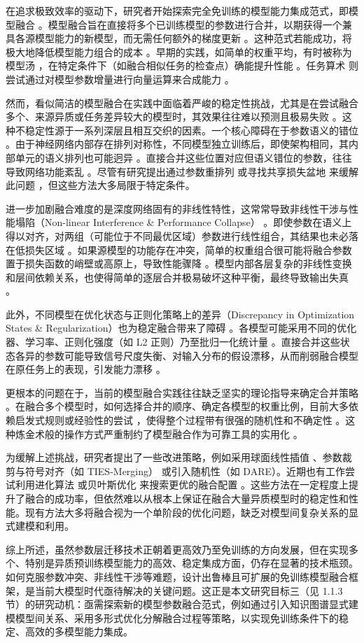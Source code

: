 \documentclass[../main.tex]{subfiles}
\begin{document}
在追求极致效率的驱动下，研究者开始探索完全免训练的模型能力集成范式，即模型融合 。模型融合旨在直接将多个已训练模型的参数进行合并，以期获得一个兼具各源模型能力的新模型，而无需任何额外的梯度更新 。这种范式若能成功，将极大地降低模型能力组合的成本 。早期的实践，如简单的权重平均，有时被称为模型汤 ，在特定条件下（如融合相似任务的检查点）确能提升性能 。任务算术 则尝试通过对模型参数增量进行向量运算来合成能力 。

然而，看似简洁的模型融合在实践中面临着严峻的稳定性挑战，尤其是在尝试融合多个、来源异质或任务差异较大的模型时，其效果往往难以预测且极易失败 。这种不稳定性源于一系列深层且相互交织的因素。一个核心障碍在于参数语义的错位 。由于神经网络内部存在排列对称性，不同模型独立训练后，即使架构相同，其内部单元的语义排列也可能迥异 。直接合并这些位置对应但语义错位的参数，往往导致网络功能紊乱 。尽管有研究提出通过参数重排列 或寻找共享损失盆地 来缓解此问题 ，但这些方法大多局限于特定条件。

进一步加剧融合难度的是深度网络固有的非线性特性，这常常导致非线性干涉与性能塌陷（Non-linear Interference \& Performance Collapse） 。即使参数在语义上得以对齐，对两组（可能位于不同最优区域）参数进行线性组合，其结果也未必落在低损失区域 。如果源模型的功能存在冲突，简单的权重组合很可能将融合参数置于损失函数的峭壁或高原上，导致性能骤降 。模型内部各层复杂的非线性变换和层间依赖关系，也使得简单的逐层合并极易破坏这种平衡，最终导致输出失真 。

此外，不同模型在优化状态与正则化策略上的差异（Discrepancy in Optimization States \& Regularization）也为稳定融合带来了障碍 。各模型可能采用不同的优化器、学习率、正则化强度（如 L2 正则）乃至批归一化统计量 。直接合并这些状态各异的参数可能导致信号尺度失衡、对输入分布的假设漂移，从而削弱融合模型在原任务上的表现，引发能力漂移 。

更根本的问题在于，当前的模型融合实践往往缺乏坚实的理论指导来确定合并策略 。在融合多个模型时，如何选择合并的顺序、确定各模型的权重比例，目前大多依赖启发式规则或经验性的尝试 ，使得整个过程带有很强的随机性和不确定性 。这种炼金术般的操作方式严重制约了模型融合作为可靠工具的实用化 。

为缓解上述挑战，研究者提出了一些改进策略，例如采用球面线性插值 、参数裁剪与符号对齐（如 TIES-Merging） 或引入随机性（如 DARE）。近期也有工作尝试利用进化算法 或贝叶斯优化 来搜索更优的融合配置 。这些方法在一定程度上提升了融合的成功率，但依然难以从根本上保证在融合大量异质模型时的稳定性和性能。现有方法大多将融合视为一个单阶段的优化问题，缺乏对模型间复杂关系的显式建模和利用。

综上所述，虽然参数层迁移技术正朝着更高效乃至免训练的方向发展，但在实现多个、特别是异质预训练模型能力的高效、稳定集成方面，仍存在显著的技术瓶颈。如何克服参数冲突、非线性干涉等难题，设计出鲁棒且可扩展的免训练模型融合框架，是当前大模型时代亟待解决的关键问题。这正是本文研究目标三（见 1.1.3 节）的研究动机：亟需探索新的模型参数融合范式，例如通过引入知识图谱显式建模模型间关系、采用多形式优化分解融合过程等策略，以实现免训练条件下的稳定、高效的多模型能力集成。
\end{document}

